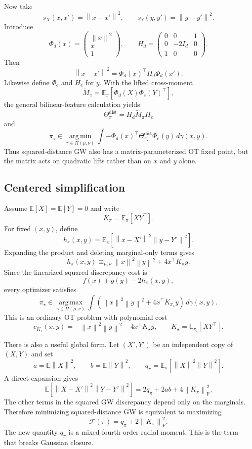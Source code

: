 \documentclass[11pt]{article}
\newcommand{\E}{\mathbb{E}}
\newcommand{\cF}{\mathcal{F}}
\newcommand{\PiCouplings}{\Pi}
\newcommand{\norm}[1]{\left\lVert #1\right\rVert}
\newcommand{\argmin}{\operatorname*{arg\,min}}
\newcommand{\argmax}{\operatorname*{arg\,max}}
\newcommand{\equivmarg}{\equiv_{\mu,\nu}}
\begin{document}
Now take
\[
s_X(x,x')=\norm{x-x'}^2,
\qquad
s_Y(y,y')=\norm{y-y'}^2.
\]
Introduce
\[
\Phi_d(x)=
\begin{pmatrix}
\norm{x}^2\\
x\\
1
\end{pmatrix},
\qquad
H_d=
\begin{pmatrix}
0 & 0 & 1\\
0 & -2I_d & 0\\
1 & 0 & 0
\end{pmatrix}.
\]
Then
\[
\norm{x-x'}^2
=
\Phi_d(x)^\top H_d\Phi_d(x').
\]
Likewise define $\Phi_e$ and $H_e$ for $y$. With the lifted cross-moment
\[
\widetilde M_\pi
=
\E_\pi\!\left[\Phi_d(X)\Phi_e(Y)^\top\right],
\]
the general bilinear-feature calculation yields
\[
\Theta_\pi^{\mathrm{dist}}
=
H_d\widetilde M_\pi H_e
\]
and
\[
\boxed{
\pi_\star\in
\argmin_{\gamma\in\PiCouplings(\mu,\nu)}
\int
-\Phi_d(x)^\top
\Theta_{\pi_\star}^{\mathrm{dist}}
\Phi_e(y)
\,d\gamma(x,y).
}
\]
Thus squared-distance GW also has a matrix-parameterized OT fixed point,
but the matrix acts on quadratic lifts rather than on $x$ and $y$ alone.

\subsection{Centered simplification}

Assume $\E[X]=\E[Y]=0$ and write
\[
K_\pi=\E_\pi[XY^\top].
\]
For fixed $(x,y)$, define
\[
h_\pi(x,y)
=
\E_\pi\!\left[
\norm{x-X'}^2\norm{y-Y'}^2
\right].
\]
Expanding the product and deleting marginal-only terms gives
\[
h_\pi(x,y)
\equivmarg
\norm{x}^2\norm{y}^2+4x^\top K_\pi y.
\]
Since the linearized squared-discrepancy cost is
\[
f(x)+g(y)-2h_\pi(x,y),
\]
every optimizer satisfies
\[
\boxed{
\pi_\star\in
\argmax_{\gamma\in\PiCouplings(\mu,\nu)}
\int
\left(
\norm{x}^2\norm{y}^2+4x^\top K_{\pi_\star}y
\right)
\,d\gamma(x,y).
}
\]
This is an ordinary OT problem with polynomial cost
\[
c_{K_\star}(x,y)
=
-\norm{x}^2\norm{y}^2-4x^\top K_\star y,
\qquad
K_\star=\E_{\pi_\star}[XY^\top].
\]

There is also a useful global form. Let $(X',Y')$ be an independent copy of
$(X,Y)$ and set
\[
a=\E\norm{X}^2,
\qquad
b=\E\norm{Y}^2,
\qquad
q_\pi=\E_\pi[\norm{X}^2\norm{Y}^2].
\]
A direct expansion gives
\[
\E\!\left[
\norm{X-X'}^2\norm{Y-Y'}^2
\right]
=
2q_\pi+2ab+4\norm{K_\pi}_{\mathrm F}^2.
\]
The other terms in the squared GW discrepancy depend only on the
marginals. Therefore minimizing squared-distance GW is equivalent to
maximizing
\[
\boxed{
\cF(\pi)
=
q_\pi+2\norm{K_\pi}_{\mathrm F}^2.
}
\]
The new quantity $q_\pi$ is a mixed fourth-order radial moment. This is the
term that breaks Gaussian closure.
\end{document}

